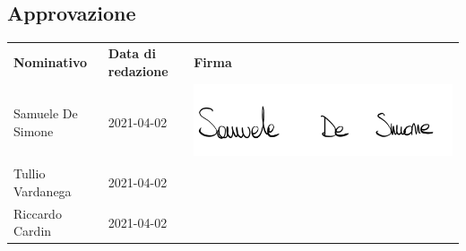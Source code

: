     \subsection{Approvazione}
        \begin{center}
            \begin{table}[h!]
                \centering
                \renewcommand{\arraystretch}{1.8}
                \begin{tabular}{p{150px} p{110px} p{110px}}
                    \rowcolor{logo!70} \textbf{Nominativo} & \textbf{Data di redazione} & \textbf{Firma}\\
                    Samuele De Simone & 2021-04-02 & \includegraphics[scale=0.06]{../../../Images/firme/firmaSamueleDeSimone.png} \\
                    Tullio Vardanega & 2021-04-02 &  \\
                    Riccardo Cardin & 2021-04-02 & \\
                \end{tabular}
            \end{table}
        \end{center}
        \pagebreak
